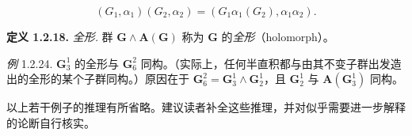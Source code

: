 \begin{equation*}
(G_{1}, \alpha_{1})(G_{2}, \alpha_{2}) = (G_{1}\alpha_{1}(G_{2}), \alpha_{1}\alpha_{2}). \tag{1.2.6}
\end{equation*}

\textbf{定义 1.2.18.} \textit{全形.} 群 $\mathbf{G} \wedge \mathbf{A}(\mathbf{G})$ 称为 $\mathbf{G}$ 的\textit{全形}（holomorph）。

\textit{例} 1.2.24. $\mathbf{G}_3^1$ 的全形与 $\mathbf{G}_6^2$ 同构。（实际上，任何半直积都与由其不变子群出发造出的全形的某个子群同构。）原因在于 $\mathbf{G}_6^2 = \mathbf{G}_3^1 \wedge \mathbf{G}_2^1$，且 $\mathbf{G}_2^1$ 与 $\mathbf{A}(\mathbf{G}_3^1)$ 同构。

以上若干例子的推理有所省略。建议读者补全这些推理，并对似乎需要进一步解释的论断自行核实。

